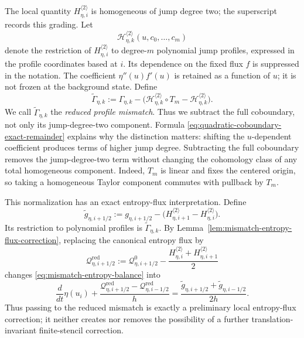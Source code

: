 \documentclass[11pt]{amsart}
\theoremstyle{plain}
\theoremstyle{definition}
\theoremstyle{remark}
\numberwithin{equation}{section}
\theoremstyle{plain}
\begin{document}
The local quantity $H_{\eta,i}^{\langle2\rangle}$ is homogeneous of jump
degree two; the superscript records this grading.  Let
\[
\mathscr H_{\eta,k}^{\langle2\rangle}(u,c_0,\ldots,c_m)
\]
denote the restriction of $H_{\eta,i}^{\langle2\rangle}$ to degree-$m$
polynomial jump profiles, expressed in the profile coordinates based at
$i$.  Its dependence on the fixed flux $f$ is suppressed in the notation.
The coefficient $\eta''(u)f'(u)$ is retained as a function of $u$; it is not
frozen at the background state.  Define
\begin{equation}\label{eq:normalized-mismatch}
	\widetilde\Gamma_{\eta,k}
	:=\Gamma_{\eta,k}
	-\bigl(\mathscr H_{\eta,k}^{\langle2\rangle}\circ T_m
	-\mathscr H_{\eta,k}^{\langle2\rangle}\bigr).
\end{equation}
We call $\widetilde\Gamma_{\eta,k}$ the \emph{reduced profile
mismatch}.
Thus we subtract the full coboundary, not only its jump-degree-two
component.  Formula \eqref{eq:quadratic-coboundary-exact-remainder} explains why
the distinction matters: shifting the $u$-dependent coefficient produces
terms of higher jump degree.  Subtracting the full coboundary removes
the jump-degree-two term without changing the cohomology class of any total
homogeneous component.  Indeed, $T_m$ is linear and fixes the centered
origin, so taking a homogeneous Taylor component commutes with pullback by
$T_m$.


This normalization has an exact entropy-flux interpretation.  Define
\begin{equation}\label{eq:reduced-full-mismatch}
	\widetilde g_{\eta,i+1/2}
	:=g_{\eta,i+1/2}
	-\bigl(H_{\eta,i+1}^{\langle2\rangle}
	-H_{\eta,i}^{\langle2\rangle}\bigr).
\end{equation}
Its restriction to polynomial profiles is
$\widetilde\Gamma_{\eta,k}$.  By
Lemma~\ref{lem:mismatch-entropy-flux-correction}, replacing the canonical
entropy flux by
\begin{equation}\label{eq:reduced-canonical-entropy-flux}
	\mathcal Q^{\mathrm{red}}_{\eta,i+1/2}
	:=\mathcal Q^0_{\eta,i+1/2}
	-\frac{H_{\eta,i}^{\langle2\rangle}
	+H_{\eta,i+1}^{\langle2\rangle}}{2}
\end{equation}
changes \eqref{eq:mismatch-entropy-balance} into
\begin{equation}\label{eq:reduced-mismatch-entropy-balance}
	\frac{d}{dt}\eta(u_i)
	+\frac{\mathcal Q^{\mathrm{red}}_{\eta,i+1/2}
	-\mathcal Q^{\mathrm{red}}_{\eta,i-1/2}}{h}
	=
	\frac{\widetilde g_{\eta,i+1/2}
	+\widetilde g_{\eta,i-1/2}}{2h}.
\end{equation}
Thus passing to the reduced mismatch is exactly a preliminary local
entropy-flux correction; it neither creates nor removes the possibility of a
further translation-invariant finite-stencil correction.
\end{document}
